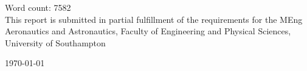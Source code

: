 \documentclass[../Interim_Report_Master]{subfiles}
\begin{document}
\begin{titlepage}
\vspace{10cm}
       

\vspace{-2.5cm}
Word count: 7582 \\
\vspace{1cm}
This report is submitted in partial fulfillment of the requirements for the MEng Aeronautics and Astronautics, Faculty of Engineering and Physical Sciences, University of Southampton


\vspace{0.5cm}
\large \today %

\vfill %

\end{titlepage}
\end{document}

